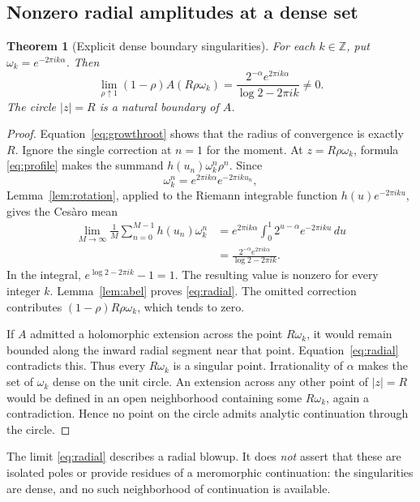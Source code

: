 \documentclass[11pt,letterpaper]{article}
\numberwithin{equation}{section}
\newtheorem{theorem}{Theorem}[section]
\theoremstyle{definition}
\theoremstyle{remark}
\newcommand{\Z}{\mathbb{Z}}
\begin{document}
\subsection{Nonzero radial amplitudes at a dense set}
\begin{theorem}[Explicit dense boundary singularities]\label{thm:boundary}
For each $k\in\Z$, put $\omega_k=e^{-2\pi i k\alpha}$. Then
\begin{equation}\label{eq:radial}
 \lim_{\rho\uparrow1}(1-\rho)A(R\rho\omega_k)
 =\frac{2^{-\alpha}e^{2\pi i k\alpha}}{\log 2-2\pi i k}\ne0.
\end{equation}
The circle $|z|=R$ is a natural boundary of $A$.
\end{theorem}
\begin{proof}
Equation~\eqref{eq:growthroot} shows that the radius of convergence is
exactly $R$. Ignore the single correction at $n=1$ for the moment.
At $z=R\rho\omega_k$, formula \eqref{eq:profile} makes the summand
$h(u_n)\omega_k^n\rho^n$. Since
\[
 \omega_k^n=e^{2\pi i k\alpha}e^{-2\pi i k u_n},
\]
Lemma~\ref{lem:rotation}, applied to the Riemann integrable function
$h(u)e^{-2\pi i k u}$, gives the Ces\`aro mean
\begin{align*}
 \lim_{M\to\infty}\frac1M\sum_{n=0}^{M-1}h(u_n)\omega_k^n
 &=e^{2\pi i k\alpha}\int_0^1 2^{u-\alpha}e^{-2\pi i k u}\,du\\
 &=\frac{2^{-\alpha}e^{2\pi i k\alpha}}{\log2-2\pi i k}.
\end{align*}
In the integral, $e^{\log2-2\pi i k}-1=1$. The resulting value is nonzero
for every integer $k$. Lemma~\ref{lem:abel} proves \eqref{eq:radial}.
The omitted correction contributes $(1-\rho)R\rho\omega_k$, which tends
to zero.

If $A$ admitted a holomorphic extension across the point $R\omega_k$, it
would remain bounded along the inward radial segment near that point.
Equation~\eqref{eq:radial} contradicts this. Thus every $R\omega_k$ is a
singular point. Irrationality of $\alpha$ makes the set of $\omega_k$ dense
on the unit circle. An extension across any other point of $|z|=R$ would
be defined in an open neighborhood containing some $R\omega_k$, again a
contradiction. Hence no point on the circle admits analytic continuation
through the circle.
\end{proof}

The limit \eqref{eq:radial} describes a radial blowup. It does \emph{not}
assert that these are isolated poles or provide residues of a meromorphic
continuation: the singularities are dense, and no such neighborhood of
continuation is available.
\end{document}
